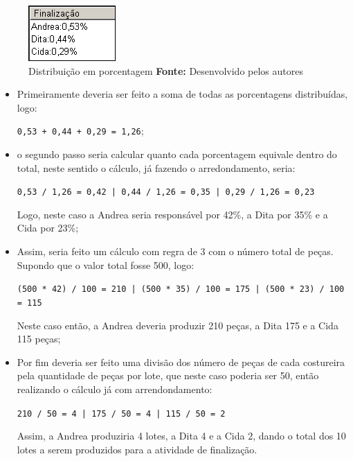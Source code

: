 \begin{figure}[h!]
	\centerline{\includegraphics[scale=1.0]{./imagens/distribuicao_porcentagem.png}}
	\caption[Distribuição em porcentagem]
	{Distribuição em porcentagem \textbf{Fonte:} Desenvolvido pelos autores}
	\label{fig:distribuicao_porcentagem}
\end{figure}

\begin{itemize}
	\item Primeiramente deveria ser feito a soma de todas as porcentagens distribuídas, logo: 
	\par \texttt{0,53 + 0,44 + 0,29 = 1,26};
	
	\item o segundo passo seria calcular quanto cada porcentagem equivale dentro do total, neste 
	sentido o cálculo, já fazendo o arredondamento, seria: 
	\par \texttt{0,53 / 1,26 = 0,42 | 0,44 / 1,26 = 0,35 | 0,29 / 1,26 = 0,23}
	\par Logo, neste caso a Andrea seria responsável por 42\%, a Dita por 35\% e a Cida por 23\%;
	
	\item Assim, seria feito um cálculo com regra de 3 com o número total de peças. Supondo que o 
	 valor total fosse 500, logo:
	
	\par \texttt{(500 * 42) / 100 = 210 | (500 * 35) / 100 = 175 | (500 * 23) / 100 = 115}
	
	\par Neste caso então, a Andrea deveria produzir 210 peças, a Dita 175 e a Cida 115 peças;
	
	\item Por fim deveria ser feito uma divisão dos número de peças de cada costureira pela quantidade
     de peças por lote, que neste caso poderia ser 50, então realizando o cálculo já com arrendondamento:
     \par \texttt{210 / 50 = 4 | 175 / 50 = 4 | 115 / 50 = 2}
     
     \par Assim, a Andrea produziria 4 lotes, a Dita 4 e a Cida 2, dando o total
     dos 10 lotes a serem produzidos para a atividade de finalização.
	
\end{itemize}
 

